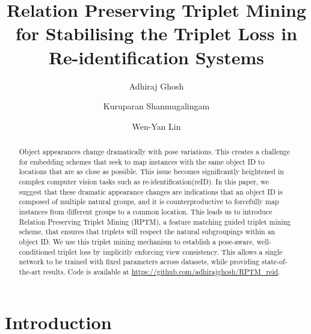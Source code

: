 \documentclass[10pt,twocolumn,letterpaper]{article}
\begin{document}
\title{Relation Preserving Triplet Mining for Stabilising the Triplet Loss in Re-identification Systems}



\author[1,2]{Adhiraj Ghosh}
\author[1,3]{Kuruparan Shanmugalingam}
\author[1]{Wen-Yan Lin}





\maketitle
\thispagestyle{empty}

\begin{abstract}
   Object appearances change dramatically with pose variations.
This creates a challenge for embedding schemes that
seek to map instances with the same object ID to locations
that are as close as possible. This issue becomes significantly
heightened in complex computer vision tasks such as
re-identification(reID). In this paper, we suggest that these
dramatic appearance changes are indications that an object
ID is composed of multiple natural groups, and it is
counterproductive to forcefully map instances from different
groups to a common location. This leads us to introduce
Relation Preserving Triplet Mining (RPTM), a feature
matching guided triplet mining scheme, that ensures that
triplets will respect the natural subgroupings within an object
ID. We use this triplet mining mechanism to establish
a pose-aware, well-conditioned triplet loss by implicitly enforcing
view consistency. This allows a single network to be
trained with fixed parameters across datasets, while providing
state-of-the-art results. Code is available at \url{https://github.com/adhirajghosh/RPTM_reid}.
\end{abstract}

\section{Introduction}
\end{document}
